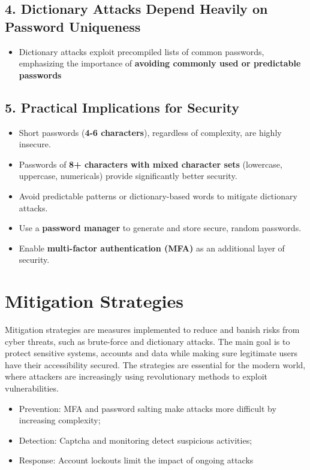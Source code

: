 \documentclass{comjnl}
\begin{document}
\newpage
\subsection*{4. Dictionary Attacks Depend Heavily on Password Uniqueness}
\begin{itemize}
    \item Dictionary attacks exploit precompiled lists of common passwords, emphasizing the importance of \textbf{avoiding commonly used or predictable passwords}
\end{itemize}

\subsection*{5. Practical Implications for Security}
\begin{itemize}
    \item Short passwords (\textbf{4-6 characters}), regardless of complexity, are highly insecure.
    \item Passwords of \textbf{8+ characters with mixed character sets} (lowercase, uppercase, numericals) provide significantly better security.
    \item Avoid predictable patterns or dictionary-based words to mitigate dictionary attacks.
    \item Use a \textbf{password manager} to generate and store secure, random passwords.
    \item Enable \textbf{multi-factor authentication (MFA)} as an additional layer of security.
\end{itemize}




\section{Mitigation Strategies}
Mitigation strategies are measures implemented to reduce and banish risks from cyber threats, such as brute-force and dictionary attacks. The main goal is to protect sensitive systems, accounts and data while making sure legitimate users have their accessibility secured. The strategies are essential for the modern world, where attackers are increasingly using revolutionary methods to exploit vulnerabilities.


\begin{itemize}
  \item Prevention: MFA and password salting make attacks more difficult by increasing complexity;
  \item Detection: Captcha and monitoring detect suspicious activities;
  \item Response: Account lockouts limit the impact of ongoing attacks
\end{itemize}
\end{document}
